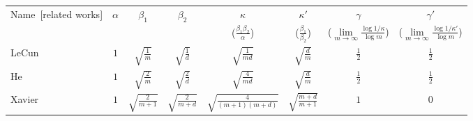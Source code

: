 \documentclass{article}
\begin{document}
\begin{table}[ht]\footnotesize
    \centering
    \begin{tabularx}{\textwidth}{lccccccc}
        \toprule
        \multirow{2}{*}{Name~\scriptsize{[{related works}]}}                                      & \multirow{2}{*}{$\alpha$} & \multirow{2}{*}{$\beta_1$} & \multirow{2}{*}{$\beta_2$} & $\kappa$                                            & $\kappa'$                                     & $\gamma$                                                                  & $\gamma'$                                                                   \\
                                                                                                  &                           &                            &                            & ($\scriptscriptstyle\frac{\beta_1\beta_2}{\alpha}$) & ($\scriptscriptstyle\frac{\beta_1}{\beta_2}$) & ($\scriptscriptstyle\lim\limits_{m\to\infty}\frac{\log1/\kappa}{\log m}$) & ($\scriptscriptstyle\lim\limits_{m\to\infty}\frac{\log 1/\kappa'}{\log m}$) \\
        \midrule
        LeCun~\scriptsize{\cite{lecun2012efficient}}                                              & $1$                       & $\sqrt{\frac{1}{m}}$       & $\sqrt{\frac{1}{d}}$       & $\sqrt{\frac{1}{md}}$                               & $\sqrt{\frac{d}{m}}$                          & $\frac{1}{2}$                                                             & $\frac{1}{2}$                                                               \\
        He~\scriptsize{\cite{he2015delving}}                                                      & $1$                       & $\sqrt{\frac{2}{m}}$       & $\sqrt{\frac{2}{d}}$       & $\sqrt{\frac{4}{md}}$                               & $\sqrt{\frac{d}{m}}$                          & $\frac{1}{2}$                                                             & $\frac{1}{2}$                                                               \\
        Xavier~\scriptsize{\cite{glorot2010understanding}}                                        & $1$                       & $\sqrt{\frac{2}{m+1}}$     & $\sqrt{\frac{2}{m+d}}$     & $\sqrt{\frac{4}{(m+1)(m+d)}}$                       & $\sqrt{\frac{m+d}{m+1}}$                      & $1$                                                                       & $0$                                                                         \\

\end{tabularx}
\end{table}
\end{document}
